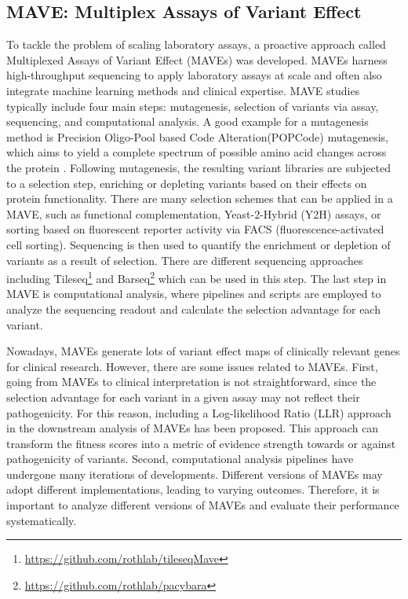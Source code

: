 \documentclass{article}
\begin{document}
\subsection{MAVE: Multiplex Assays of Variant Effect}
To tackle the problem of scaling laboratory assays, a proactive approach called Multiplexed Assays of Variant Effect (MAVEs)\cite{Starita295279} was developed. MAVEs harness high-throughput sequencing to apply laboratory assays at scale and often also integrate machine learning methods and clinical expertise.
MAVE studies typically include four main steps: mutagenesis, selection of variants via assay, sequencing, and computational analysis. A good example for a mutagenesis method is Precision Oligo-Pool based Code Alteration(POPCode) mutagenesis, which aims to yield a complete spectrum of possible amino acid changes across the protein \cite{weile_framework_2017}. Following mutagenesis, the resulting variant libraries are subjected to a selection step, enriching or depleting variants based on their effects on protein functionality. There are many selection schemes that can be applied in a MAVE, such as functional complementation, Yeast-2-Hybrid (Y2H) assays, or sorting based on fluorescent reporter activity via FACS (fluorescence-activated cell sorting). Sequencing is then used to quantify the enrichment or depletion of variants as a result of selection. There are different sequencing approaches including Tileseq\footnote{\url{https://github.com/rothlab/tileseqMave}} and Barseq\footnote{\url{https://github.com/rothlab/pacybara}} which can be used in this step.
The last step in MAVE is computational analysis, where pipelines and scripts are employed to analyze the sequencing readout and calculate the selection advantage for each variant.

Nowadays, MAVEs generate lots of variant effect maps of clinically relevant genes for clinical research. However, there are some issues related to MAVEs. First, going from MAVEs to clinical interpretation is not straightforward, since the selection advantage for each variant in a given assay may not reflect their pathogenicity. For this reason, including a Log-likelihood Ratio (LLR) approach in the downstream analysis of MAVEs has been proposed. This approach can transform the fitness scores into a metric of evidence strength towards or against pathogenicity of variants. Second, computational analysis pipelines have undergone many iterations of developments. Different versions of MAVEs may adopt different implementations, leading to varying outcomes. Therefore, it is important to analyze different versions of MAVEs and evaluate their performance systematically.
\end{document}
